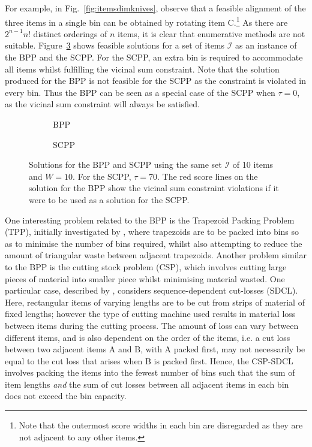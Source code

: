\documentclass[authoryear]{elsarticle}
\begin{document}
\noindent For example, in Fig.~\ref{fig:itemsdimknives}, observe that a feasible alignment of the three items in a single bin can be obtained by rotating item C.\footnote{Note that the outermost score widths in each bin are disregarded as they are not adjacent to any other items.} As there are $2^{n-1} n!$ distinct orderings of $n$ items, it is clear that enumerative methods are not suitable. Figure~\ref{fig:bppvscpp} shows feasible solutions for a set of items $\mathcal{I}$ as an instance of the BPP and the SCPP. For the SCPP, an extra bin is required to accommodate all items whilst fulfilling the vicinal sum constraint. Note that the solution produced for the BPP is not feasible for the SCPP as the constraint is violated in every bin. Thus the BPP can be seen as a special case of the SCPP when $\tau=0$, as the vicinal sum constraint will always be satisfied.

\begin{figure}[H]
	\centering	
	\begin{subfigure}[h]{0.38\textwidth}
		
		\caption{BPP}
		\label{fig:bpp}
	\end{subfigure} \hspace{15mm}
	\begin{subfigure}[h]{0.38\textwidth}
		
		\caption{SCPP}
		\label{fig:scpp}
	\end{subfigure}
	\caption{Solutions for the BPP and SCPP using the same set $\mathcal{I}$ of 10 items and $W = 10$. For the SCPP, $\tau = 70$. The red score lines on the solution for the BPP show the vicinal sum constraint violations if it were to be used as a solution for the SCPP.}	
	\label{fig:bppvscpp}
\end{figure}

\noindent One interesting problem related to the BPP is the Trapezoid Packing Problem (TPP), initially investigated by \citet{lewis2011}, where trapezoids are to be packed into bins so as to minimise the number of bins required, whilst also attempting to reduce the amount of triangular waste between adjacent trapezoids. Another problem similar to the BPP is the cutting stock problem (CSP), which involves cutting large pieces of material into smaller piece whilst minimising material wasted. One particular case, described by \citet{garraffa2016}, considers sequence-dependent cut-losses (SDCL). Here, rectangular items of varying lengths are to be cut from strips of material of fixed lengths; however the type of cutting machine used results in material loss between items during the cutting process. The amount of loss can vary between different items, and is also dependent on the order of the items, i.e. a cut loss between two adjacent items A and B, with A packed first, may not necessarily be equal to the cut loss that arises when B is packed first. Hence, the CSP-SDCL involves packing the items into the fewest number of bins such that the sum of item lengths \emph{and} the sum of cut losses between all adjacent items in each bin does not exceed the bin capacity.
\end{document}
